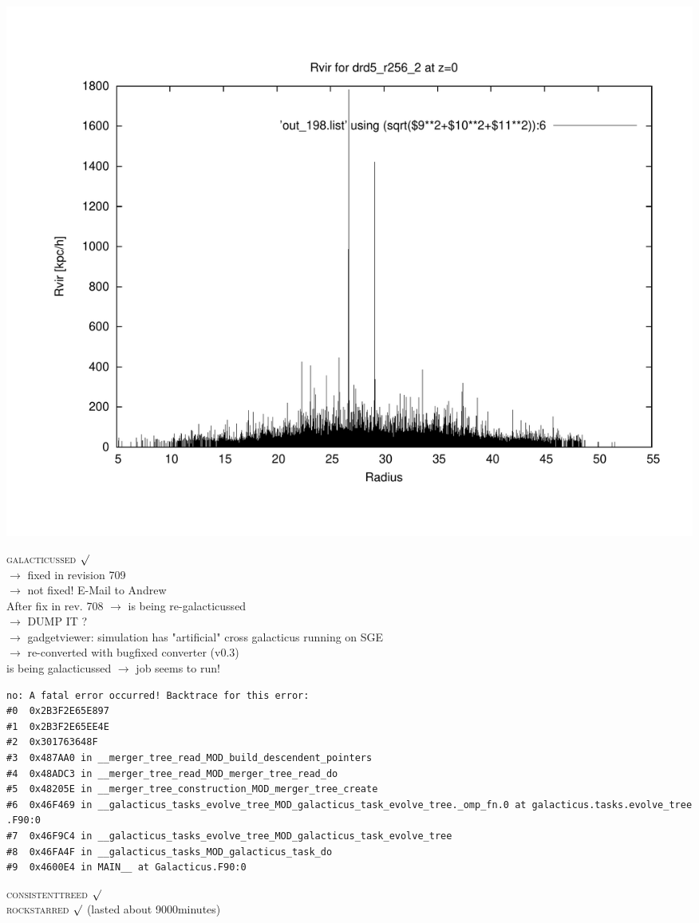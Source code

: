 \includegraphics[scale=0.3]{drd5_r256_2/plot_rvir_z0.pdf}

\textsc{galacticussed} $\surd$ \\
$\rightarrow$ fixed in revision 709 \\
$\rightarrow$  not fixed! E-Mail to Andrew \\
After fix in rev. 708 $\rightarrow$ is being re-galacticussed \\
$\rightarrow$ DUMP IT ? \\
$\rightarrow$ gadgetviewer: simulation has "artificial" cross 
galacticus running on SGE \\
$\rightarrow$ re-converted with bugfixed converter (v0.3) \\
is being galacticussed $\rightarrow$ job seems to run! \\
\begin{verbatim}
no: A fatal error occurred! Backtrace for this error:
#0  0x2B3F2E65E897
#1  0x2B3F2E65EE4E
#2  0x301763648F
#3  0x487AA0 in __merger_tree_read_MOD_build_descendent_pointers
#4  0x48ADC3 in __merger_tree_read_MOD_merger_tree_read_do
#5  0x48205E in __merger_tree_construction_MOD_merger_tree_create
#6  0x46F469 in __galacticus_tasks_evolve_tree_MOD_galacticus_task_evolve_tree._omp_fn.0 at galacticus.tasks.evolve_tree
.F90:0
#7  0x46F9C4 in __galacticus_tasks_evolve_tree_MOD_galacticus_task_evolve_tree
#8  0x46FA4F in __galacticus_tasks_MOD_galacticus_task_do
#9  0x4600E4 in MAIN__ at Galacticus.F90:0
\end{verbatim}
\textsc{consistenttreed} $\surd$ \\ 
\textsc{rockstarred} $\surd$ (lasted about 9000minutes) \\

